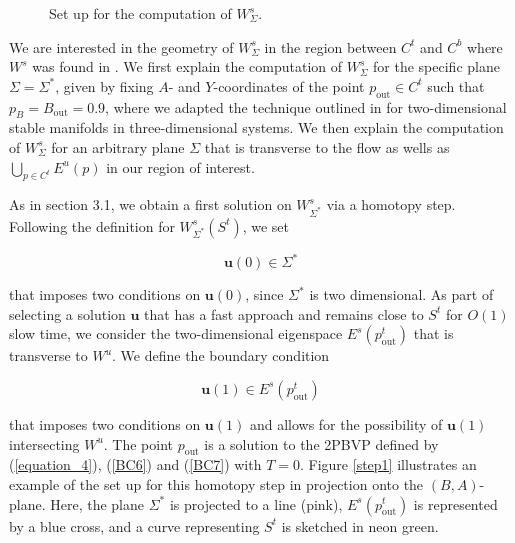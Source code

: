 \documentclass{ws-ijbc}
\begin{document}
\begin{figure}[h]
\caption{Set up for the computation of $W^{s}_{\Sigma}$.}
\end{figure}
    
We are interested in the geometry of $W^{s}_{\Sigma}$ in the region between $C^t$ and $C^b$ where $W^s$ was found in \cite{QSSA}.  We first explain the computation of $W^s_{\Sigma}$ for the specific plane $\Sigma = \Sigma^*$, given by fixing $A$- and $Y$-coordinates of the point $p_{\text{out}} \in C^t$ such that $p_B=B_{\text{out}}=0.9$, where we adapted the technique outlined in \cite{Saeed_Paper} for two-dimensional stable manifolds in three-dimensional systems.  We then explain the computation of $W^{s}_{\Sigma}$ for an arbitrary plane $\Sigma$ that is transverse to the flow as wells as $\bigcup_{p \in C^t} E^u(p)$ in our region of interest.
    
As in section 3.1, we obtain a first solution on $W^s_{\Sigma^*}$ via a homotopy step.  Following the definition for $W^s_{\Sigma^*}(S^t)$, we set
    
\begin{equation}
\mathbf{u}(0) \in \Sigma^*
\label{BC6}
\end{equation}
    
 \noindent
that imposes two conditions on $\mathbf{u}(0)$, since $\Sigma^*$ is two dimensional.  As part of selecting a solution $\mathbf{u}$ that has a fast approach and remains close to $S^t$ for $O(1)$ slow time, we consider the two-dimensional eigenspace $E^s(p^t_{\text{out}})$ that is transverse to $W^u$.  We define the boundary condition
    
\begin{equation}
\mathbf{u}(1) \in E^s(p^t_{\text{out}})
\label{BC7}
\end{equation}
    
\noindent
that imposes two conditions on $\mathbf{u}(1)$ and allows for the possibility of $\mathbf{u}(1)$ intersecting $W^u$.  The point $p_{\text{out}}$ is a solution to the 2PBVP defined by (\ref{equation_4}), (\ref{BC6}) and (\ref{BC7}) with $T=0$.  Figure \ref{step1} illustrates an example of the set up for this homotopy step in projection onto the $(B,A)$-plane.  Here, the plane $\Sigma^*$ is projected to a line (pink), $E^s(p^t_{\mathrm{out}})$ is represented by a blue cross, and a curve representing $S^t$ is sketched in neon green.
    
\end{document}
